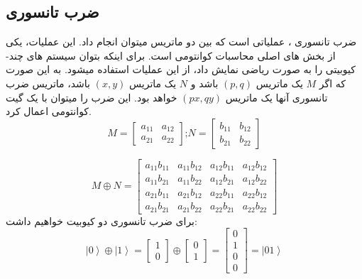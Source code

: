 \subsection{ضرب تانسوری}
ضرب تانسوری
، عملیاتی است که بین دو ماتریس میتوان انجام داد. این عملیات، یکی از بخش های اصلی محاسبات کوانتومی است. برای اینکه بتوان سیستم های چند-کیوبیتی
را به صورت ریاضی نمایش داد، از این عملیات استفاده میشود. به این صورت که اگر $M$ یک ماتریس $(p,q)$ باشد و  $N$ یک ماتریس $(x,y)$ باشد، ماتریس ضرب تانسوری آنها یک ماتریس $(px,qy)$ خواهد بود. 
\cite{fundamentalsandapplications}
این ضرب را میتوان با یک گیت کوانتومی
 اعمال کرد.
\begin{equation}
M =  \begin{bmatrix}
 a_{11} &  a_{12}
\\
 a_{21} & a_{22}
\end{bmatrix}
\text{;}
N =  \begin{bmatrix}
 b_{11} &  b_{12}
\\
 b_{21} &  b_{22}
\end{bmatrix}
\end{equation}

\begin{equation}
M \oplus  N =  \begin{bmatrix}
 a_{11}b_{11} &  a_{11}b_{12} &  a_{12}b_{11} &  a_{12}b_{12}
\\
 a_{11}b_{21} &  a_{11}b_{22} &  a_{12}b_{21} &  a_{12}b_{22}
\\
 a_{21}b_{11} &  a_{21}b_{12} &  a_{22}b_{11} &  a_{22}b_{12}
\\
 a_{21}b_{21} &  a_{21}b_{22} &  a_{22}b_{21} &  a_{22}b_{22}
\end{bmatrix}
\end{equation}
برای ضرب تانسوری دو کیوبیت خواهیم داشت:
\begin{equation}
\left|0\right\rangle  \oplus  \left|1\right\rangle  =
\begin{bmatrix}
1 \\ 0 
\end{bmatrix} 
\oplus 
\begin{bmatrix}
0 \\ 1 
\end{bmatrix} 
=
  \begin{bmatrix}
0
\\
1
\\
0
\\
0
\end{bmatrix} = \left|01\right\rangle
\end{equation}
